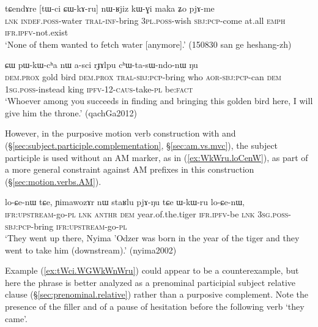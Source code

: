 \begin{exe}
\ex \label{ex:CWkAru.nWRjiz}
\gll  tɕendɤre [tɯ-ci ɕɯ-kɤ-ru] nɯ-ʁjiz kɯ-ɣi maka ʑo pjɤ-me \\
\textsc{lnk} \textsc{indef}.\textsc{poss}-water \textsc{tral}-\textsc{inf}-bring \textsc{3pl}.\textsc{poss}-wish \textsc{sbj}:\textsc{pcp}-come at.all \textsc{emph} \textsc{ifr}.\textsc{ipfv}-not.exist \\
\glt `None of them wanted to fetch water [anymore].' (150830 san ge heshang-zh)
\end{exe}

\begin{exe}
\ex \label{ex:CWkWru.pWkWcha}
 ɕɯ pɯ-kɯ-cʰa nɯ a-sci rɟɤlpu cʰɯ-ta-sɯ-ndo-nɯ ŋu  \\
\textsc{dem}.\textsc{prox} gold bird \textsc{dem}.\textsc{prox} \textsc{tral}-\textsc{sbj}:\textsc{pcp}-bring who \textsc{aor}-\textsc{sbj}:\textsc{pcp}-can \textsc{dem} \textsc{1sg}.\textsc{poss}-instead king \textsc{ipfv}-1\fl{}2-\textsc{caus}-take-\textsc{pl} be:\textsc{fact} \\
\glt `Whoever among you succeeds in finding and bringing this golden bird here, I will give him the throne.' (qachGa2012)
\end{exe}

 
However, in the purposive motion verb construction with  and  (§\ref{sec:subject.participle.complementation}, §\ref{sec:am.vs.mvc}), the subject participle  is used without an AM marker, as in (\ref{ex:WkWru.loCenW}), as part of a more general constraint against AM prefixes in this construction (§\ref{sec:motion.verbs.AM}).

\begin{exe}
\ex \label{ex:WkWru.loCenW}
\gll  lo-ɕe-nɯ tɕe,  ɲimawozɤr nɯ staʁlu pjɤ-ŋu tɕe ɯ-kɯ-ru lo-ɕe-nɯ,  \\
\textsc{ifr}:\textsc{upstream}-go-\textsc{pl} \textsc{lnk}  \textsc{anthr} \textsc{dem} year.of.the.tiger \textsc{ifr}.\textsc{ipfv}-be \textsc{lnk} \textsc{3sg}.\textsc{poss}-\textsc{sbj}:\textsc{pcp}-bring \textsc{ifr}:\textsc{upstream}-go-\textsc{pl} \\
\glt `They went up there, Nyima 'Odzer was born in the year of the tiger and they went to take him (downstream).' (nyima2002)
\end{exe}

Example (\ref{ex:tWci.WGWkWnWru}) could appear to be a counterexample, but here the phrase  is better analyzed as a prenominal participial subject relative clause (§\ref{sec:prenominal.relative}) rather than a purposive complement. Note the presence of the filler  and of a pause of hesitation before the following verb  `they came'.

